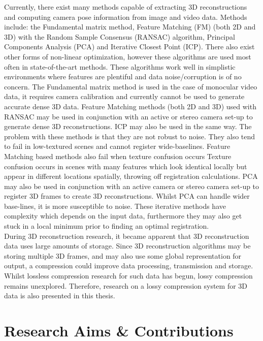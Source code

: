 Currently, there exist many methods capable of extracting 3D reconstructions and computing camera pose information from image and video data. Methods include: the Fundamental matrix method, Feature Matching (FM) (both 2D and 3D) with the Random Sample Consensus (RANSAC) algorithm, Principal Components Analysis (PCA) and Iterative Closest Point (ICP). There also exist other forms of non-linear optimization, however these algorithms are used most often in state-of-the-art methods. These algorithms work well in simplistic environments where features are plentiful and data noise/corruption is of no concern. The Fundamental matrix method is used in the case of monocular video data, it requires camera calibration and currently cannot be used to generate accurate dense 3D data. Feature Matching methods (both 2D and 3D) used with RANSAC may be used in conjunction with an active or stereo camera set-up to generate dense 3D reconstructions. ICP may also be used in the same way. The problem with these methods is that they are not robust to noise. They also tend to fail in low-textured scenes and cannot register wide-baselines. Feature Matching based methods also fail when texture confusion occurs Texture confusion occurs in scenes with many features which look identical locally but appear in different locations spatially, throwing off registration calculations. PCA may also be used in conjunction with an active camera or stereo camera set-up to register 3D frames to create 3D reconstructions. Whilst PCA can handle wider base-lines, it is more susceptible to noise. These iterative methods have complexity which depends on the input data, furthermore they may also get stuck in a local minimum prior to finding an optimal registration. \\


During 3D reconstruction research, it became apparent that 3D reconstruction data uses large amounts of storage. Since 3D reconstruction algorithms may be storing multiple 3D frames, and may also use some global representation for output, a compression could improve data processing, transmission and storage. Whilst lossless compression research for such data has begun, lossy compression remains unexplored. Therefore, research on a lossy compression system for 3D data is also presented in this thesis. \\


\section{Research Aims \& Contributions}

